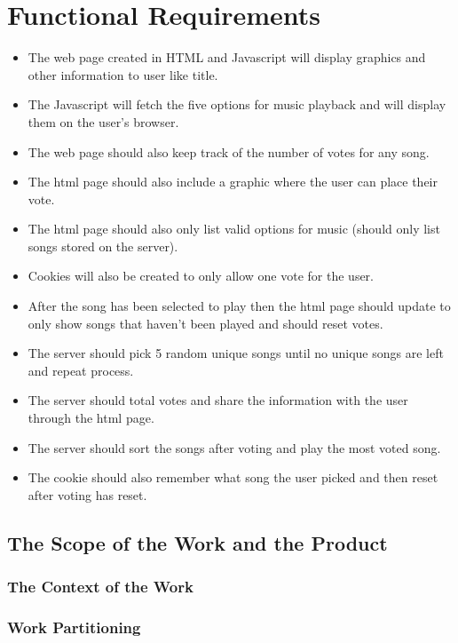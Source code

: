 \documentclass[12pt, titlepage]{article}
\begin{document}
\section{Functional Requirements}
 \begin{itemize}
 \item The web page created in HTML and Javascript will display graphics and other information to user like title. 
 \item The Javascript will fetch the five options for music playback and will display them on the user's browser.
 \item The web page should also keep track of the number of votes for any song.
 \item The html page should also include a graphic where the user can place their vote.
 \item The html page should also only list valid options for music (should only list songs stored on the server).
 \item Cookies will also be created to only allow one vote for the user.
 \item After the song has been selected to play then the html page should update to only show songs that haven't been played and should reset votes.
 \item The server should pick 5 random unique songs until no unique songs are left and repeat process. 
 \item The server should total votes and share the information with the user through the html page.
 \item The server should sort the songs after voting and play the most voted song.
 \item The cookie should also remember what song the user picked and then reset after voting has reset.
 \end{itemize}

\subsection{The Scope of the Work and the Product}

\subsubsection{The Context of the Work}

\subsubsection{Work Partitioning}
\end{document}
